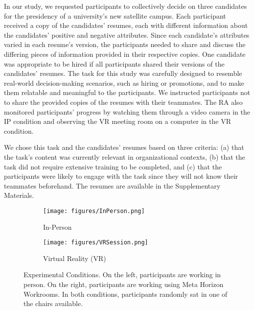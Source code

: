 In our study, we requested participants to collectively decide on three candidates for the presidency of a university's new satellite campus. Each participant received a copy of the candidates' resumes, each with different information about the candidates' positive and negative attributes. Since each candidate's attributes varied in each resume's version, the participants needed to share and discuss the differing pieces of information provided in their respective copies. One candidate was appropriate to be hired if all participants shared their versions of the candidates' resumes. The task for this study was carefully designed to resemble real-world decision-making scenarios, such as hiring or promotions, and to make them relatable and meaningful to the participants. We instructed participants not to share the provided copies of the resumes with their teammates. The RA also monitored participants' progress by watching them through a video camera in the IP condition and observing the VR meeting room on a computer in the VR condition. 

We chose this task and the candidates' resumes based on three criteria: (a) that the task's content was currently relevant in organizational contexts, (b) that the task did not require extensive training to be completed, and (c) that the participants were likely to engage with the task since they will not know their teammates beforehand. The resumes are available in the Supplementary Materials.

 \begin{figure*}[!htb]
\centering
    \begin{subfigure}[b]{.48\textwidth}
        \texttt{[image: figures/InPerson.png]}
        \caption{In-Person}
        \label{figure:in-person-session}
    \end{subfigure}\qquad
    \begin{subfigure}[b]{.47\textwidth}
        \texttt{[image: figures/VRSession.png]}
        \caption{Virtual Reality (VR)}
        \label{figure:vr-session}
    \end{subfigure}
\caption{Experimental Conditions. On the left, participants are working in person. On the right, participants are working using Meta Horizon Workrooms. In both conditions, participants randomly sat in one of the chairs available.}
\label{fig:experimental-conditions}
\end{figure*} 

